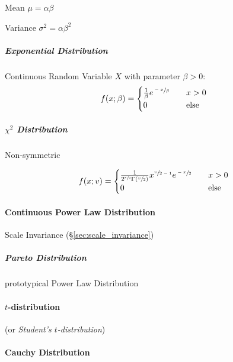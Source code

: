Mean $\mu = \alpha \beta$

Variance $\sigma^2 = \alpha \beta^2$



\subparagraph{Exponential Distribution}\label{sec:exponential_squared}\hfill

Continuous Random Variable $X$ with parameter $\beta > 0$:
\[
  f(x; \beta) =
  \begin{cases}
  \frac{1}{\beta} e^{\sfrac{-x}{\beta}}     & \quad x > 0 \\
  0     & \quad\text{else} \\
  \end{cases}
\]



\subparagraph{$\chi^2$ Distribution}\label{sec:chi_squared}\hfill

Non-symmetric

\[
  f(x; v) =
  \begin{cases}
  \frac{1}{2^{\sfrac{v}{2}}\Gamma(\sfrac{v}{2})} x^{\sfrac{v}{2-1}} e^{\sfrac{-x}{2}}     & \quad x > 0 \\
  0     & \quad\text{else} \\
  \end{cases}
\]



\paragraph{Continuous Power Law Distribution}
\label{sec:continuous_power_law_distribution}\hfill

Scale Invariance (\S\ref{sec:scale_invariance})



\subparagraph{Pareto Distribution}\label{sec:pareto_distribution}\hfill

prototypical Power Law Distribution



\paragraph{$t$-distribution}\label{sec:t_distribution}\hfill

(or \emph{Student's $t$-distribution})



\paragraph{Cauchy Distribution}\label{sec:cauchy_distribution}\hfill

